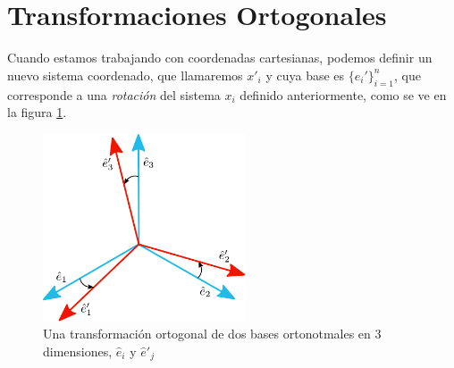 


\section{Transformaciones Ortogonales}

Cuando estamos trabajando con coordenadas cartesianas, podemos definir un nuevo sistema coordenado, que llamaremos $x'_i$ y cuya base es $\{ \hat{e}_i'\}_{i=1}^n$, que corresponde a una \emph{rotación} del sistema $x_i$ definido anteriormente, como se ve en la figura \ref{fig:bases-ortonormales}.

\begin{figure}[htbp]
    \centering
    \includegraphics[width=6cm]{Figuras/fig-rotacion-bases.pdf}
    \caption{Una transformación ortogonal de dos bases ortonotmales en 3 dimensiones, $\hat{e}_i$ y $\hat{e}'_j$}
    \label{fig:bases-ortonormales}
\end{figure}

